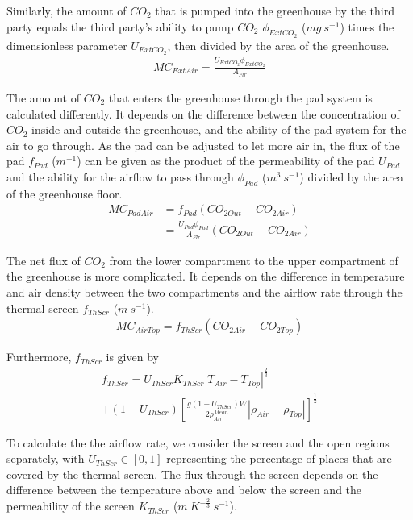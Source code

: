 \documentclass[a4paper]{article}
\numberwithin{equation}{section}
\begin{document}
Similarly, the amount of \(CO_2\) that is pumped into the greenhouse by the third party equals the third party's ability to pump \(CO_2\) \(\phi_{ExtCO_2}\) (\(mg\ s^{-1}\)) times the dimensionless parameter \(U_{ExtCO_2}\), then divided by the area of the greenhouse.
\begin{align}
  MC_{ExtAir} = \frac{U_{ExtCO_2}\phi_{ExtCO_2}}{A_{Flr}}
\end{align}

The amount of \(CO_2\) that enters the greenhouse through the pad system is calculated differently.
It depends on the difference between the concentration of \(CO_2\) inside and outside the greenhouse, and the ability of the pad system for the air to go through.
As the pad can be adjusted to let more air in, the flux of the pad \(f_{Pad}\) (\(m^{-1}\)) can be given as the product of the permeability of the pad \(U_{Pad}\) and the ability for the airflow to pass through \(\phi_{Pad}\) (\(m^3\ s^{-1}\)) divided by the area of the greenhouse floor.
\begin{equation}
  \begin{split}
    MC_{PadAir} & = f_{Pad} (CO_{2 Out} - CO_{2 Air}) \\
    & = \frac{U_{Pad} \phi_{Pad}}{A_{Flr}} (CO_{2 Out} - CO_{2 Air})
  \end{split}
\end{equation}

The net flux of \(CO_2\) from the lower compartment to the upper compartment of the greenhouse is more complicated.
It depends on the difference in temperature and air density between the two compartments and the airflow rate through the thermal screen \(f_{ThScr}\) (\(m\ s^{-1}\)).
\begin{align}
  MC_{AirTop} = f_{ThScr} (CO_{2 Air} - CO_{2 Top})
\end{align}

Furthermore, \(f_{ThScr}\) is given by
\begin{multline}
  f_{ThScr} = U_{ThScr} K_{ThScr} |T_{Air} - T_{Top}|^{\frac{2}{3}} \\
  + (1 - U_{ThScr}) {\left[\frac{g(1 - U_{ThScr})W}{2\rho^{Mean}_{Air}} |\rho_{Air} - \rho_{Top}|\right]}^{\frac{1}{2}}
\end{multline}

To calculate the the airflow rate, we consider the screen and the open regions separately, with \(U_{ThScr} \in [0,1]\) representing the percentage of places that are covered by the thermal screen. The flux through the screen depends on the difference between the temperature above and below the screen and the permeability of the screen \(K_{ThScr}\) (\(m\ K^{-\frac{2}{3}}\ s^{-1}\)).
\end{document}
